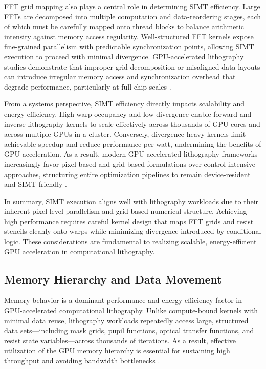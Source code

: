 \documentclass[pdflatex,sn-mathphys-num]{sn-jnl}%
\theoremstyle{thmstyleone}%
\theoremstyle{thmstyletwo}%
\theoremstyle{thmstylethree}%
\begin{document}
FFT grid mapping also plays a central role in determining SIMT efficiency. Large FFTs are decomposed into multiple computation and data-reordering stages, each of which must be carefully mapped onto thread blocks to balance arithmetic intensity against memory access regularity. Well-structured FFT kernels expose fine-grained parallelism with predictable synchronization points, allowing SIMT execution to proceed with minimal divergence. GPU-accelerated lithography studies demonstrate that improper grid decomposition or misaligned data layouts can introduce irregular memory access and synchronization overhead that degrade performance, particularly at full-chip scales \cite{Zheng2023,Cao2023}.

From a systems perspective, SIMT efficiency directly impacts scalability and energy efficiency. High warp occupancy and low divergence enable forward and inverse lithography kernels to scale effectively across thousands of GPU cores and across multiple GPUs in a cluster. Conversely, divergence-heavy kernels limit achievable speedup and reduce performance per watt, undermining the benefits of GPU acceleration. As a result, modern GPU-accelerated lithography frameworks increasingly favor pixel-based and grid-based formulations over control-intensive approaches, structuring entire optimization pipelines to remain device-resident and SIMT-friendly \cite{Zheng2023,Cao2023}.

In summary, SIMT execution aligns well with lithography workloads due to their inherent pixel-level parallelism and grid-based numerical structure. Achieving high performance requires careful kernel design that maps FFT grids and resist stencils cleanly onto warps while minimizing divergence introduced by conditional logic. These considerations are fundamental to realizing scalable, energy-efficient GPU acceleration in computational lithography.

\subsection{Memory Hierarchy and Data Movement}
Memory behavior is a dominant performance and energy-efficiency factor in GPU-accelerated computational lithography. Unlike compute-bound kernels with minimal data reuse, lithography workloads repeatedly access large, structured data sets—including mask grids, pupil functions, optical transfer functions, and resist state variables—across thousands of iterations. As a result, effective utilization of the GPU memory hierarchy is essential for sustaining high throughput and avoiding bandwidth bottlenecks \cite{4490127,kirk10}.
\end{document}

